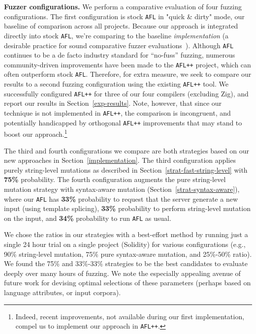 \noindent \textbf{Fuzzer configurations.} We perform a comparative evaluation
of four fuzzing configurations.  The first configuration is stock \texttt{AFL}
in "quick \& dirty" mode, our baseline of comparison across all projects.
Because our approach is integrated directly into stock \texttt{AFL}, we're
comparing to the baseline \emph{implementation} (a desirable practice for sound
comparative fuzzer evaluations~\cite{BoehmeCR21}).
Although \texttt{AFL} continues to be a de facto industry standard for
``no-fuss'' fuzzing, numerous community-driven improvements have been made to
the \texttt{AFL++} project, which can often outperform stock \texttt{AFL}.
Therefore, for extra measure, we seek to compare our results to a second
fuzzing configuration using the existing \texttt{AFL++} tool. We successfully
configured \texttt{AFL++} for three of our four compilers (excluding Zig), and
report our results in Section~\ref{exp-results}.  Note, however, that since our
technique is not implemented in \texttt{AFL++}, the comparison is incongruent,
and potentially handicapped by orthogonal \texttt{AFL++} improvements that may
stand to boost our approach.\footnote{Indeed, recent improvements, not
available during our first implementation, compel us to implement our approach
in \texttt{AFL++}.}

The third and fourth configurations we compare are both strategies based on our
new approaches in Section~\ref{implementation}. The third configuration applies
purely string-level mutations as described in
Section~\ref{strat-fast-string-level} with \textbf{75\%} probability. The fourth configuration augments the pure
string-level mutation strategy with syntax-aware mutation
(Section~\ref{strat-syntax-aware}), where our \texttt{AFL} has \textbf{33\%}
probability to request that the server generate a new input (using template
splicing), \textbf{33\%} probability to perform string-level mutation on the
input, and \textbf{34\%} probability to run \texttt{AFL} as usual.

We chose the ratios in our strategies with a best-effort method by running just
a single 24 hour trial on a single project (Solidity) for various
configurations (e.g., 90\% string-level mutation, 75\% pure syntax-aware
mutation, and 25\%-50\% ratio). We found the 75\% and 33\%-33\% strategies
to be the best candidates to evaluate deeply over many hours of fuzzing. We
note the especially appealing avenue of future work for devising optimal
selections of these parameters (perhaps based on language attributes, or input
corpora).

